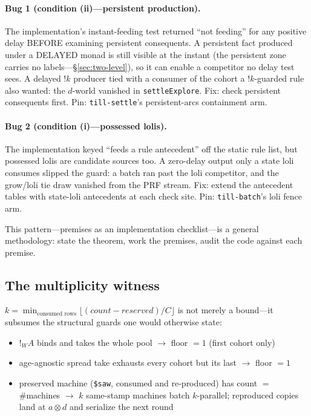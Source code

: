 \documentclass[11pt]{article}
\theoremstyle{remark}
\begin{document}
\paragraph{Bug 1 (condition (ii)---persistent production).} The implementation's
instant-feeding test returned ``not feeding'' for any positive delay BEFORE
examining persistent consequents.  A persistent fact produced under a DELAYED
monad is still visible at the instant (the persistent zone carries no
labels---\S\ref{sec:two-level}), so it can enable a competitor no delay test sees.
A delayed $!k$ producer tied with a consumer of the cohort a $!k$-guarded rule
also wanted: the $d$-world vanished in \texttt{settleExplore}.  Fix: check
persistent consequents first.  Pin: \texttt{till-settle}'s
persistent-arcs containment arm.

\paragraph{Bug 2 (condition (i)---possessed lolis).} The implementation keyed
``feeds a rule antecedent'' off the static rule list, but possessed lolis are
candidate sources too.  A zero-delay output only a state loli consumes slipped the
guard: a batch ran past the loli competitor, and the grow/loli tie draw vanished
from the PRF stream.  Fix: extend the antecedent tables with state-loli
antecedents at each check site.  Pin: \texttt{till-batch}'s loli fence arm.

This pattern---premises as an implementation checklist---is a general methodology:
state the theorem, work the premises, audit the code against each premise.

\subsection{The multiplicity witness}
\label{sec:multiplicity-witness}

$k = \min_{\text{consumed rows}} \lfloor(\mathit{count} -
\mathit{reserved})/C\rfloor$ is not merely a bound---it subsumes the structural
guards one would otherwise state:
\begin{itemize}
\item $!_W A$ binds and takes the whole pool $\to$ floor $= 1$ (first cohort
  only)
\item age-agnostic spread take exhausts every cohort but its last $\to$ floor $= 1$
\item preserved machine (\texttt{\$saw}, consumed and re-produced) has count $=$
  \#machines $\to$ $k$ same-stamp machines batch $k$-parallel; reproduced copies
  land at $a \otimes d$ and serialize the next round
\end{itemize}
\end{document}

